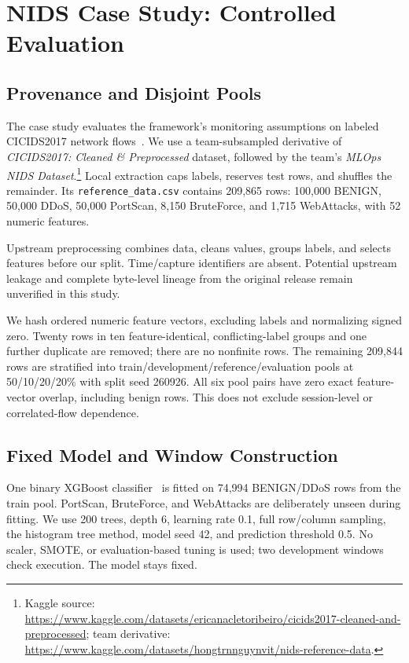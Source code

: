 \documentclass[runningheads]{llncs}
\begin{document}
\section{NIDS Case Study: Controlled Evaluation}
\label{sec:protocol}
\subsection{Provenance and Disjoint Pools}
The case study evaluates the framework's monitoring assumptions on labeled CICIDS2017 network flows~\cite{cicids}. We use a team-subsampled derivative of \emph{CICIDS2017: Cleaned \& Preprocessed} dataset, followed by the team's \emph{MLOps NIDS Dataset}.\footnote{\raggedright Kaggle source: \url{https://www.kaggle.com/datasets/ericanacletoribeiro/cicids2017-cleaned-and-preprocessed}; team derivative: \url{https://www.kaggle.com/datasets/hongtrnnguynvit/nids-reference-data}.} Local extraction caps labels, reserves test rows, and shuffles the remainder. Its \texttt{reference\_data.csv} contains 209,865 rows: 100,000 BENIGN, 50,000 DDoS, 50,000 PortScan, 8,150 BruteForce, and 1,715 WebAttacks, with 52 numeric features.

Upstream preprocessing combines data, cleans values, groups labels, and selects features before our split. Time/capture identifiers are absent. Potential upstream leakage and complete byte-level lineage from the original release remain unverified in this study.

We hash ordered numeric feature vectors, excluding labels and normalizing signed zero. Twenty rows in ten feature-identical, conflicting-label groups and one further duplicate are removed; there are no nonfinite rows. The remaining 209,844 rows are stratified into train/development/reference/evaluation pools at 50/10/20/20\% with split seed 260926. All six pool pairs have zero exact feature-vector overlap, including benign rows. This does not exclude session-level or correlated-flow dependence.

\subsection{Fixed Model and Window Construction}
One binary XGBoost classifier~\cite{xgboost} is fitted on 74,994 BENIGN/DDoS rows from the train pool. PortScan, BruteForce, and WebAttacks are deliberately unseen during fitting. We use 200 trees, depth 6, learning rate 0.1, full row/column sampling, the histogram tree method, model seed 42, and prediction threshold 0.5. No scaler, SMOTE, or evaluation-based tuning is used; two development windows check execution. The model stays fixed.
\end{document}
